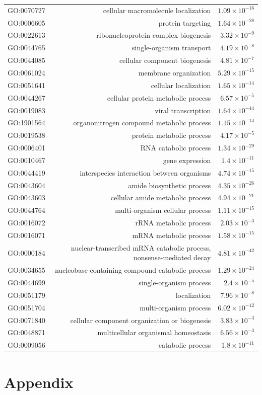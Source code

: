 \documentclass{book}
\begin{document}
\begin{table}[htbp]
\begin{tabular}{rrr}
			GO:0070727 & cellular macromolecule localization & $1.09\times 10^{-16}$ \\
			GO:0006605 & protein targeting & $1.64\times 10^{-28}$ \\
			GO:0022613 & ribonucleoprotein complex biogenesis & $3.32\times 10^{-9}$ \\
			GO:0044765 & single-organism transport & $4.19\times 10^{-8}$ \\
			GO:0044085 & cellular component biogenesis & $4.81\times 10^{-7}$ \\
			GO:0061024 & membrane organization & $5.29\times 10^{-15}$ \\
			GO:0051641 & cellular localization & $1.65\times 10^{-14}$ \\
			GO:0044267 & cellular protein metabolic process & $6.57\times 10^{-5}$ \\
			GO:0019083 & viral transcription & $1.64\times 10^{-44}$ \\
			GO:1901564 & organonitrogen compound metabolic process & $1.15\times 10^{-14}$ \\
			GO:0019538 & protein metabolic process & $4.17\times 10^{-5}$ \\
			GO:0006401 & RNA catabolic process & $1.34\times 10^{-29}$ \\
			GO:0010467 & gene expression & $1.4\times 10^{-11}$ \\
			GO:0044419 & interspecies interaction between organisms & $4.74\times 10^{-15}$ \\
			GO:0043604 & amide biosynthetic process & $4.35\times 10^{-26}$ \\
			GO:0043603 & cellular amide metabolic process & $4.94\times 10^{-21}$ \\
			GO:0044764 & multi-organism cellular process & $1.11\times 10^{-15}$ \\
			GO:0016072 & rRNA metabolic process & $2.03\times 10^{-3}$ \\
			GO:0016071 & mRNA metabolic process & $1.58\times 10^{-15}$ \\
			GO:0000184 & nuclear-transcribed mRNA catabolic process, nonsense-mediated decay & $4.81\times 10^{-42}$ \\
			GO:0034655 & nucleobase-containing compound catabolic process & $1.29\times 10^{-24}$ \\
			GO:0044699 & single-organism process & $2.4\times 10^{-5}$ \\
			GO:0051179 & localization & $7.96\times 10^{-8}$ \\
			GO:0051704 & multi-organism process & $6.02\times 10^{-12}$ \\
			GO:0071840 & cellular component organization or biogenesis & $3.83\times 10^{-3}$ \\
			GO:0048871 & multicellular organismal homeostasis & $6.56\times 10^{-3}$ \\
			GO:0009056 & catabolic process & $1.8\times 10^{-11}$ \\
			\bottomrule
		\end{tabular}%
		\label{tab:yellowGO}%
	\end{table}%

	\chapter*{Appendix}
\end{document}
